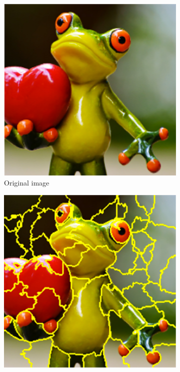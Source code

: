 \begin{figure}[H]
    \centering
    \begin{subfigure}[t]{.35\textwidth}
        \centering
        \includegraphics[width=\linewidth]{chapters/02_methods/images/frog1.png}
        \caption{Original image}
    \end{subfigure}\hspace{1.5cm}%
    \begin{subfigure}[t]{.35\textwidth}
        \centering
        \includegraphics[width=\linewidth]{chapters/02_methods/images/frog2.png}

\end{subfigure}
\end{figure}
